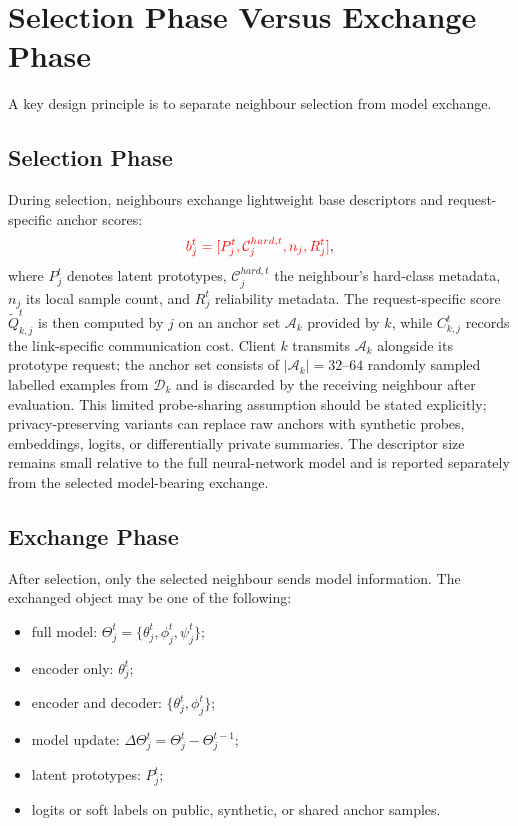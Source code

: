\documentclass[conference]{IEEEtran}
\newcommand{\rev}[1]{{\color{red}#1}}
\begin{document}
\section{Selection Phase Versus Exchange Phase}
\label{sec:selection-phase-versus-exchange-phase}

A key design principle is to separate neighbour selection from model exchange.

\subsection{Selection Phase}
\label{subsec:selection-phase}
During selection, neighbours exchange lightweight base descriptors and request-specific anchor scores:
\begin{equation}
    \rev{b_j^t = [P_j^t,\mathcal{C}_j^{hard,t}, n_j, R_j^t]},
    \label{eq:auto-034}
\end{equation}
where \(P_j^t\) denotes latent prototypes, \rev{\(\mathcal{C}_j^{hard,t}\) the neighbour's hard-class metadata, \(n_j\) its local sample count, and \(R_j^t\) reliability metadata. The request-specific score \(\tilde{Q}_{k,j}^t\) is then computed by \(j\) on an anchor set \(\mathcal{A}_k\) provided by \(k\), while \(C_{k,j}^t\) records the link-specific communication cost.} Client \(k\) transmits \(\mathcal{A}_k\) alongside its prototype request; the anchor set consists of \(|\mathcal{A}_k| = 32\)--\(64\) randomly sampled labelled examples from \(\mathcal{D}_k\) and is discarded by the receiving neighbour after evaluation. This limited probe-sharing assumption should be stated explicitly; privacy-preserving variants can replace raw anchors with synthetic probes, embeddings, logits, or differentially private summaries. The descriptor size remains small relative to the full neural-network model and is reported separately from the selected model-bearing exchange.

\subsection{Exchange Phase}
\label{subsec:exchange-phase}
After selection, only the selected neighbour sends model information. The exchanged object may be one of the following:
\begin{itemize}
    \item full model: \(\Theta_j^t=\{\theta_j^t,\phi_j^t,\psi_j^t\}\);
    \item encoder only: \(\theta_j^t\);
    \item encoder and decoder: \(\{\theta_j^t,\phi_j^t\}\);
    \item model update: \(\Delta\Theta_j^t=\Theta_j^t-\Theta_j^{t-1}\);
    \item latent prototypes: \(P_j^t\);
    \item logits or soft labels on public, synthetic, or shared anchor samples.
\end{itemize}
\end{document}
